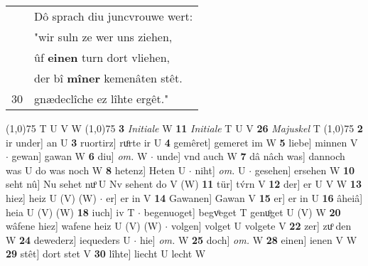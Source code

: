 \documentclass[8pt,a4paper,notitlepage]{article}
\begin{document}
\begin{table}[ht]
\begin{minipage}[t]{0.5\linewidth}
\begin{tabular}{rl}
 & Dô sprach diu juncvrouwe wert:\\ 
 & "wir suln ze wer uns ziehen,\\ 
 & ûf \textbf{einen} turn dort vliehen,\\ 
 & der bî \textbf{mîner} kemenâten stêt.\\ 
30 & gnædeclîche ez lîhte ergêt."\\ 
\end{tabular}
\scriptsize
\line(1,0){75} \newline
T U V W \newline
\line(1,0){75} \newline
\textbf{3} \textit{Initiale} W  \textbf{11} \textit{Initiale} T U V  \textbf{26} \textit{Majuskel} T  \newline
\line(1,0){75} \newline
\textbf{2} ir under] an U \textbf{3} ruortirz] ruͦrte ir U \textbf{4} gemêret] gemeret im W \textbf{5} liebe] minnen V  $\cdot$ gewan] gawan W \textbf{6} diu] \textit{om.} W  $\cdot$ unde] vnd auch W \textbf{7} dâ nâch was] dannoch was U do was noch W \textbf{8} hetenz] Heten U  $\cdot$ niht] \textit{om.} U  $\cdot$ gesehen] ersehen W \textbf{10} seht nû] Nu sehet nuͦ U Nv sehent do V (W) \textbf{11} tür] tv́rn V \textbf{12} der] er U V W \textbf{13} hiez] heiz U (V) (W)  $\cdot$ er] er in V \textbf{14} Gawanen] Gawan V \textbf{15} er] er in U \textbf{16} âheiâ] heia U (V) (W) \textbf{18} iuch] iv T  $\cdot$ begenuoget] begvͦeget T genuͦget U (V) W \textbf{20} wâfene hiez] wafene heiz U (V) (W)  $\cdot$ volgen] volget U volgete V \textbf{22} zer] zuͦ den W \textbf{24} dewederz] iequeders U  $\cdot$ hie] \textit{om.} W \textbf{25} doch] \textit{om.} W \textbf{28} einen] ienen V W \textbf{29} stêt] dort stet V \textbf{30} lîhte] liecht U lecht W \newline
\end{minipage}
\end{table}
\end{document}
